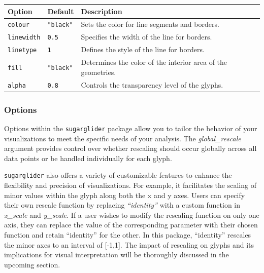 \begin{longtable}[]{@{}
  >{\raggedright\arraybackslash}p{}
  >{\raggedright\arraybackslash}p{}
  >{\raggedright\arraybackslash}p{}@{}}
\toprule\noalign{}
\begin{minipage}[b]{\linewidth}\raggedright
Option
\end{minipage} & \begin{minipage}[b]{\linewidth}\raggedright
Default
\end{minipage} & \begin{minipage}[b]{\linewidth}\raggedright
Description
\end{minipage} \\
\midrule\noalign{}
\endhead
\bottomrule\noalign{}
\endlastfoot
\texttt{colour} & \texttt{"black"} & Sets the color for line segments and borders. \\
\texttt{linewidth} & \texttt{0.5} & Specifies the width of the line for borders. \\
\texttt{linetype} & \texttt{1} & Defines the style of the line for borders. \\
\texttt{fill} & \texttt{"black"} & Determines the color of the interior area of the geometries. \\
\texttt{alpha} & \texttt{0.8} & Controls the transparency level of the glyphs. \\
\end{longtable}

\subsubsection{Options}\label{options}

Options within the \texttt{sugarglider} package allow you to tailor the behavior of your visualizations to meet the specific needs of your analysis. The \emph{global\_rescale} argument provides control over whether rescaling should occur globally across all data points or be handled individually for each glyph.

\texttt{sugarglider} also offers a variety of customizable features to enhance the flexibility and precision of visualizations. For example, it facilitates the scaling of minor values within the glyph along both the x and y axes. Users can specify their own rescale function by replacing \emph{``identity''} with a custom function in \emph{x\_scale} and \emph{y\_scale}. If a user wishes to modify the rescaling function on only one axis, they can replace the value of the corresponding parameter with their chosen function and retain ``identity'' for the other. In this package, ``identity'' rescales the minor axes to an interval of {[}-1,1{]}. The impact of rescaling on glyphs and its implications for visual interpretation will be thoroughly discussed in the upcoming section.

